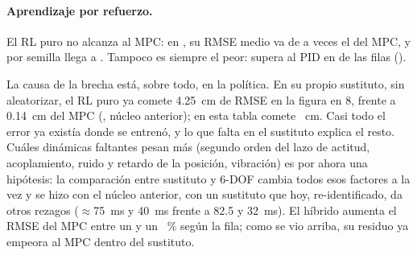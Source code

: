 \paragraph{Aprendizaje por refuerzo.} El RL puro no alcanza al MPC: en
, su RMSE medio va de  a 
veces el del MPC, y por semilla llega a . Tampoco es
siempre el peor: supera al PID en  de las 
filas ().

La causa de la brecha está, sobre todo, en la política. En su propio
sustituto, sin aleatorizar, el RL puro ya comete 4.25~cm de RMSE en la
figura en 8, frente a 0.14~cm del MPC (,
núcleo anterior); en esta tabla comete ~cm. Casi
todo el error ya existía donde se entrenó, y lo que falta en el
sustituto explica el resto. Cuáles dinámicas faltantes pesan más
(segundo orden del lazo de actitud, acoplamiento, ruido y retardo de la
posición, vibración) es por ahora una hipótesis: la comparación entre
sustituto y 6-DOF cambia todos esos factores a la vez y se hizo con el
núcleo anterior, con un sustituto que hoy, re-identificado, da otros
rezagos ($\approx$75~ms y 40~ms frente a 82.5 y 32~ms). El híbrido
aumenta el RMSE del MPC entre un  y un ~\% según la
fila; como se vio arriba, su residuo ya empeora al MPC dentro del sustituto.
